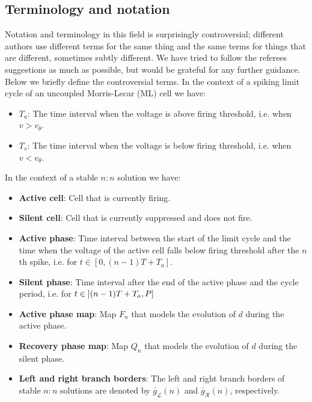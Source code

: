 \documentclass[utf8]{article}
\begin{document}
\subsection{Terminology and notation}
\label{sec:terminology}
Notation and terminology in this field is surprisingly controversial; different authors use different terms for the same thing and the same terms for things that are different, sometimes subtly different.
We have tried to follow the referees suggestions as much as possible, but would be grateful for any further guidance.
Below we briefly define the controversial terms.
In the context of a spiking limit cycle of an uncoupled Morris-Lecar (ML) cell we have:
\begin{itemize}
\item $T_{a}$: The time interval when the voltage is above firing threshold, i.e. when $v>v_{\theta}$.
\item $T_{s}$: The time interval when the voltage is below firing threshold, i.e. when $v<v_{\theta}$.
\end{itemize}
In the context of a stable $n:n$ solution we have:
\begin{itemize}
\item \textbf{Active cell}: Cell that is currently firing.
\item \textbf{Silent cell}: Cell that is currently suppressed and does not fire.
\item \textbf{Active phase}: Time interval between the start of the limit cycle and the time when the voltage of the active cell falls below firing threshold after the $n$th spike, i.e. for $t \in \left[0, (n-1)T + T_{a}\right]$.
\item \textbf{Silent phase}: Time interval after the end of the active phase and the cycle period, i.e. for $t \in \interval[open left]{(n-1)T+T_{a}}{P}$
\item \textbf{Active phase map}: Map $F_{n}$ that models the evolution of $d$ during the active phase.
\item \textbf{Recovery phase map}: Map $Q_{n}$ that models the evolution of $d$ during the silent phase.
\item \textbf{Left and right branch borders}: The left and right branch borders of stable $n:n$ solutions are denoted by $\bar g_{\mathcal{L}}(n)$ and $\bar g_{\mathcal{R}}(n)$, respectively.
\end{itemize}
\end{document}
